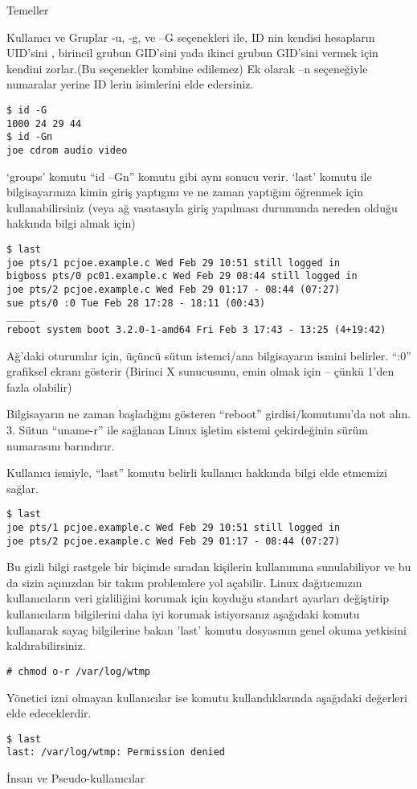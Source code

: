 \begin{section}{Temeller}
\begin{subsection}{Kullanıcı ve Gruplar}
-u, -g, ve –G seçenekleri ile, ID nin kendisi hesapların UID’sini , birincil grubun GID’sini yada ikinci grubun GID’sini vermek için kendini zorlar.(Bu seçenekler kombine edilemez) Ek olarak –n seçeneğiyle numaralar yerine ID lerin isimlerini elde edersiniz.
\begin{verbatim}
$ id -G
1000 24 29 44
$ id -Gn
joe cdrom audio video
\end{verbatim}

‘groups’ komutu “id –Gn” komutu gibi aynı sonucu verir. ‘last’ komutu ile bilgisayarınıza kimin giriş yaptıgını ve ne zaman yaptığını öğrenmek için kullanabilirsiniz (veya ağ vasıtasıyla giriş yapılması durumunda nereden olduğu hakkında bilgi almak için)
\begin{verbatim}
$ last
joe pts/1 pcjoe.example.c Wed Feb 29 10:51 still logged in
bigboss pts/0 pc01.example.c Wed Feb 29 08:44 still logged in
joe pts/2 pcjoe.example.c Wed Feb 29 01:17 - 08:44 (07:27)
sue pts/0 :0 Tue Feb 28 17:28 - 18:11 (00:43)
_____
reboot system boot 3.2.0-1-amd64 Fri Feb 3 17:43 - 13:25 (4+19:42)
\end{verbatim}

Ağ’daki oturumlar için, üçüncü sütun istemci/ana bilgisayarın ismini belirler. “:0” grafiksel ekranı gösterir (Birinci X sunucusunu, emin olmak için – çünkü 1’den fazla olabilir)

Bilgisayarın ne zaman başladığını gösteren “reboot” girdisi/komutunu’da not alın. 3. Sütun “uname-r” ile sağlanan Linux işletim sistemi çekirdeğinin sürüm numarasını barındırır.

Kullanıcı ismiyle, “last” komutu belirli kullanıcı hakkında bilgi elde etmemizi sağlar.
\begin{verbatim}
$ last
joe pts/1 pcjoe.example.c Wed Feb 29 10:51 still logged in
joe pts/2 pcjoe.example.c Wed Feb 29 01:17 - 08:44 (07:27)
\end{verbatim}

Bu gizli bilgi rastgele bir biçimde sıradan kişilerin kullanımına sunulabiliyor ve bu da sizin açınızdan bir takım problemlere yol açabilir. Linux dağıtıcınızın kullanıcıların veri gizliliğini korumak için koyduğu standart ayarları değiştirip kullanıcıların bilgilerini daha iyi korumak istiyorsanız aşağıdaki komutu kullanarak sayaç bilgilerine bakan 'last' komutu dosyasının genel okuma yetkisini
kaldırabilirsiniz.
\begin{verbatim}
# chmod o-r /var/log/wtmp
\end{verbatim}

Yönetici izni olmayan kullanıcılar ise komutu kullandıklarında aşağıdaki değerleri elde edeceklerdir.
\begin{verbatim}
$ last
last: /var/log/wtmp: Permission denied
\end{verbatim}
\end{subsection}
\begin{subsection}{İnsan ve Pseudo-kullanıcılar}


\end{subsection}
\end{section}
